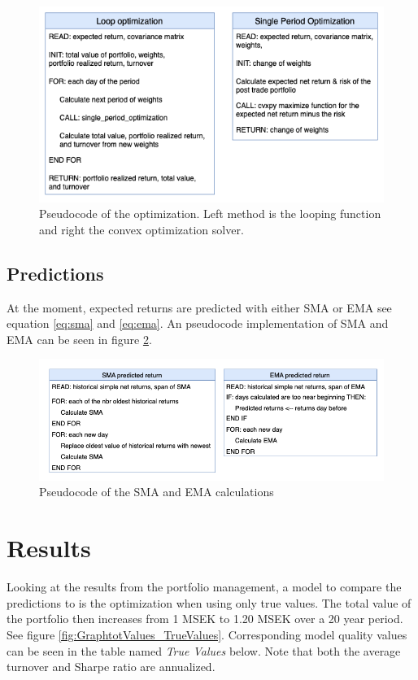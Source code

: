 \documentclass{LTHtwocol} %
\begin{document}
\begin{figure}[h]
	\centering
	\includegraphics[width=1\columnwidth]{Pics/optimizationPseud.png}
	\caption{Pseudocode of the optimization. Left method is the looping function and right the convex optimization solver.}
	\label{fig:optimization} %
\end{figure}
\subsection{Predictions}
At the moment, expected returns are predicted with either SMA or EMA see equation \ref{eq:sma} and \ref{eq:ema}. An pseudocode implementation of SMA and EMA can be seen in figure \ref{fig:SMAnEMApseud}.

\newpage
\begin{figure}[h]
	\centering
	\includegraphics[width=1\columnwidth]{Pics/SMAnEMApseud.png}
	\caption{Pseudocode of the SMA and EMA calculations}
	\label{fig:SMAnEMApseud} %
\end{figure}


\section{Results}
Looking at the results from the portfolio management, a model to compare the predictions to is the optimization when using only true values. The total value of the portfolio then increases from 1 MSEK to 1.20 MSEK over a 20 year period. See figure \ref{fig:GraphtotValues_TrueValues}. Corresponding model quality values can be seen in the table named \textit{True Values} below. Note that both the average turnover and Sharpe ratio are  annualized.
\end{document}
